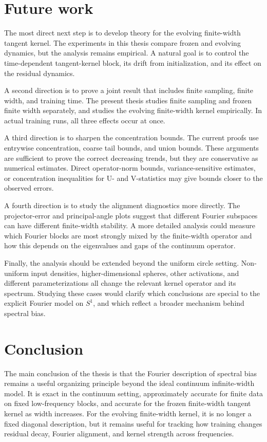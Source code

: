 \section{Future work}
\label{sec:future-work}

The most direct next step is to develop theory for the evolving finite-width
tangent kernel. The experiments in this thesis compare frozen and evolving
dynamics, but the analysis remains empirical. A natural goal is to control the
time-dependent tangent-kernel block, its drift from initialization, and its
effect on the residual dynamics.

A second direction is to prove a joint result that includes finite sampling,
finite width, and training time. The present thesis studies finite sampling and
frozen finite width separately, and studies the evolving finite-width kernel
empirically. In actual training runs, all three effects occur at once.

A third direction is to sharpen the concentration bounds. The current proofs use
entrywise concentration, coarse tail bounds, and union bounds. These arguments
are sufficient to prove the correct decreasing trends, but they are conservative
as numerical estimates. Direct operator-norm bounds, variance-sensitive
estimates, or concentration inequalities for U- and V-statistics may give bounds
closer to the observed errors.

A fourth direction is to study the alignment diagnostics more directly. The
projector-error and principal-angle plots suggest that different Fourier
subspaces can have different finite-width stability. A more detailed analysis
could measure which Fourier blocks are most strongly mixed by the finite-width
operator and how this depends on the eigenvalues and gaps of the continuum
operator.

Finally, the analysis should be extended beyond the uniform circle setting.
Non-uniform input densities, higher-dimensional spheres, other activations, and
different parameterizations all change the relevant kernel operator and its
spectrum. Studying these cases would clarify which conclusions are special to
the explicit Fourier model on \(S^1\), and which reflect a broader mechanism
behind spectral bias.

\section{Conclusion}
\label{sec:conclusion}

The main conclusion of the thesis is that the Fourier description of spectral
bias remains a useful organizing principle beyond the ideal continuum
infinite-width model. It is exact in the continuum setting, approximately
accurate for finite data on fixed low-frequency blocks, and accurate for the
frozen finite-width tangent kernel as width increases. For the evolving
finite-width kernel, it is no longer a fixed diagonal description, but it remains
useful for tracking how training changes residual decay, Fourier alignment, and
kernel strength across frequencies.

